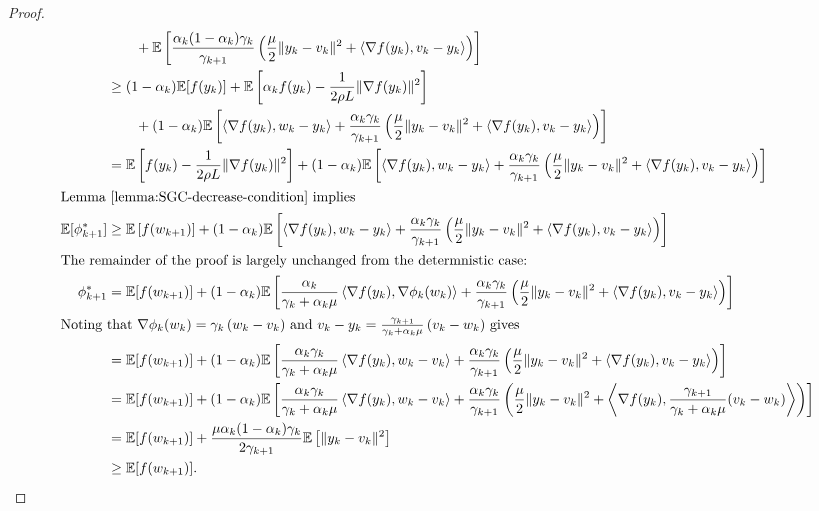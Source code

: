 \begin{proof}
\begin{align*}
        & \quad \quad+ \mathbb{E}\left[\frac{\alpha_k(1-\alpha_k)\gamma_k}{\gamma_{k+1}}\left(\frac{\mu}{2} \|y_k - v_k\|^2 + \left\langle\nabla f(y_k), v_k - y_k\right\rangle\right)\right] \\
        &\geq  (1-\alpha_k) \mathbb{E}[f(y_k)] + \mathbb{E}\left[\alpha_k f(y_k) - \frac{1}{2\rho L} \|\nabla f(y_k)\|^2\right] \\
        & \quad \quad + (1-\alpha_k) \mathbb{E}\left[\left\langle\nabla f(y_k), w_k - y_k\right\rangle + \frac{\alpha_k\gamma_k}{\gamma_{k+1}}\left(\frac{\mu}{2} \|y_k - v_k\|^2 + \left\langle\nabla f(y_k), v_k - y_k\right\rangle\right)\right] \\
        &=  \mathbb{E}\left[f(y_k) - \frac{1}{2\rho L} \|\nabla f(y_k)\|^2\right] + (1-\alpha_k) \mathbb{E}\left[\left\langle\nabla f(y_k), w_k - y_k\right\rangle + \frac{\alpha_k\gamma_k}{\gamma_{k+1}}\left(\frac{\mu}{2} \|y_k - v_k\|^2 + \left\langle\nabla f(y_k), v_k - y_k\right\rangle\right)\right] \\
        \intertext{Lemma~\ref{lemma:SGC-decrease-condition} implies }
        \mathbb{E}[\phi_{k+1}^*] &\geq \mathbb{E}\left[f(w_{k+1})\right] + (1-\alpha_k) \mathbb{E}\left[\left\langle\nabla f(y_k), w_k - y_k\right\rangle + \frac{\alpha_k\gamma_k}{\gamma_{k+1}}\left(\frac{\mu}{2} \|y_k - v_k\|^2 + \left\langle\nabla f(y_k), v_k - y_k\right\rangle\right)\right] \\
        \intertext{The remainder of the proof is largely unchanged from the determnistic case:}
        \phi_{k+1}^*  &=  \mathbb{E}[f(w_{k+1})] + (1-\alpha_k) \mathbb{E}\left[\frac{\alpha_k}{\gamma_k + \alpha_k \mu} \left\langle\nabla f(y_k), \nabla\phi_k(w_k)\right\rangle + \frac{\alpha_k\gamma_k}{\gamma_{k+1}}\left(\frac{\mu}{2} \|y_k - v_k\|^2 + \left\langle\nabla f(y_k), v_k - y_k\right\rangle\right)\right] \\
        \intertext{Noting that \( \nabla \phi_k(w_k) = \gamma_k \left(w_k- v_k\right) \) and \( v_k - y_k= \frac{\gamma_{k+1}}{\gamma_k + \alpha_k \mu}\left(v_k - w_k\right) \) gives }
        &= \mathbb{E}[f(w_{k+1})] +(1-\alpha_k) \mathbb{E}\left[\frac{\alpha_k \gamma_k}{\gamma_k + \alpha_k \mu} \left\langle\nabla f(y_k), w_k - v_k\right\rangle + \frac{\alpha_k\gamma_k}{\gamma_{k+1}}\left(\frac{\mu}{2} \|y_k - v_k\|^2 + \left\langle\nabla f(y_k), v_k - y_k\right\rangle\right)\right] \\
        &= \mathbb{E}[f(w_{k+1})] + (1-\alpha_k) \mathbb{E}\left[\frac{\alpha_k \gamma_k}{\gamma_k + \alpha_k \mu} \left\langle\nabla f(y_k), w_k - v_k\right\rangle + \frac{\alpha_k\gamma_k}{\gamma_{k+1}}\left(\frac{\mu}{2} \|y_k - v_k\|^2 + \left\langle\nabla f(y_k), \frac{\gamma_{k+1}}{\gamma_k + \alpha_k \mu}(v_k - w_k)\right\rangle\right)\right] \\
        &= \mathbb{E}[f(w_{k+1})] + \frac{\mu \alpha_k(1-\alpha_k)\gamma_k}{2 \gamma_{k+1}} \mathbb{E}\left[\|y_k - v_k\|^2\right] \\
        &\geq \mathbb{E}[f(w_{k+1})].
    \end{align*}
\end{proof}


